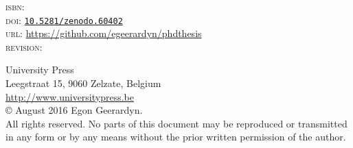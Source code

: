 \thispagestyle{empty}
\begin{bottompar}

\textsc{isbn:} \\
\textsc{doi:} \href{http://dx.doi.org/10.5281/zenodo.60402}{\texttt{10.5281/zenodo.60402}}\\
\textsc{url:} \url{https://github.com/egeerardyn/phdthesis}\\
\textsc{revision:} \texttt{\VCRevision}

University Press\\
Leegstraat 15, 9060 Zelzate, Belgium\\
\url{http://www.universitypress.be}\\

\copyright{} August 2016 Egon Geerardyn.\\

All rights reserved. No parts of this document may be reproduced or transmitted in any form or by any means without the prior written permission of the author.





\end{bottompar}
